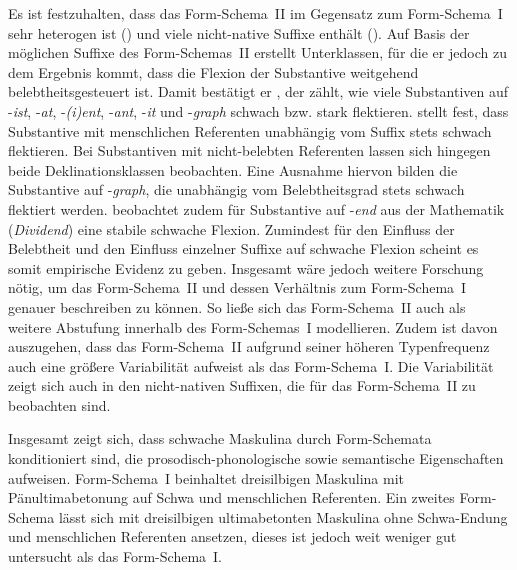 Es ist festzuhalten, dass das Form-Schema~II im Gegensatz zum Form-Schema~I sehr heterogen ist (\cite[78--79]{Poitou.2004}) und viele nicht-native Suffixe enthält (\cite[99]{Bittner.20031991}). Auf Basis der möglichen Suffixe des Form-Schemas~II erstellt \textcite[78--79]{Poitou.2004} Unterklassen,  für die er jedoch zu dem Ergebnis kommt, dass die Flexion der Substantive weitgehend belebtheitsgesteuert ist. Damit bestätigt er \textcite[165--176]{Kopcke.1995}, der zählt, wie viele Substantiven auf -\textit{ist}, -\textit{at}, -\textit{(i)ent}, -\textit{ant}, -\textit{it} und -\textit{graph} schwach bzw. stark flektieren. \textcite[175]{Kopcke.1995} stellt fest, dass Substantive mit men\-schli\-chen Referenten unabhängig vom Suffix stets schwach flektieren. Bei Substantiven mit nicht-belebten Referenten lassen sich hingegen beide Deklinationsklassen beobachten. Eine Ausnahme hiervon bilden die Substantive auf -\textit{graph}, die unabhängig vom Belebtheitsgrad stets schwach flektiert werden. \textcite[78--79]{Poitou.2004} beobachtet zudem für Substantive auf -\textit{end} aus der Mathematik (\textit{Dividend}) eine stabile schwache Flexion. Zumindest für den Einfluss der Belebtheit und den Einfluss einzelner Suffixe auf schwache Flexion scheint es somit empirische Evidenz zu geben. Insgesamt wäre jedoch weitere Forschung nötig, um das Form-Schema~II und dessen Verhältnis zum Form-Schema~I genauer beschreiben zu können. So ließe sich das Form-Schema~II auch als weitere Abstufung innerhalb des Form-Schemas~I modellieren. Zudem ist davon auszugehen, dass das Form-Schema~II aufgrund seiner höheren Typenfrequenz auch eine größere Variabilität aufweist als das Form-Schema~I. Die Variabilität zeigt sich auch in den nicht-nativen Suffixen, die für das Form-Schema~II zu beobachten sind.

\begin{sloppypar}
Insgesamt zeigt sich, dass schwache Maskulina durch Form-Schemata konditioniert sind, die prosodisch-phonologische sowie semantische Eigenschaften aufweisen. Form-Schema~I beinhaltet dreisilbigen Maskulina mit Pänultimabetonung auf Schwa und menschlichen Referenten. Ein zweites Form-Schema lässt sich mit dreisilbigen ultimabetonten Maskulina ohne Schwa-Endung und menschlichen Referenten ansetzen, dieses ist jedoch weit weniger gut untersucht als das Form-Schema~I.
\end{sloppypar}


